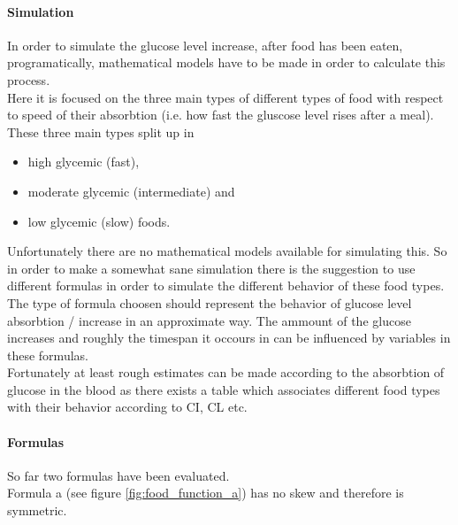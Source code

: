 \documentclass[pdflatex,a4paper,11pt,english]{scrreprt}
\begin{document}
\paragraph{Simulation} 
In order to simulate the glucose level increase, after food has been eaten, programatically, mathematical models have to be made in order to calculate this process. \\
Here it is focused on the three main types of different types of food with respect to speed of their absorbtion (i.e. how fast the gluscose level rises after a meal). \\
These three main types split up in

\begin{itemize}
  \item high glycemic (fast),
  \item moderate glycemic (intermediate) and
  \item low glycemic (slow) foods.
\end{itemize}

Unfortunately there are no mathematical models available for simulating this.
So in order to make a somewhat sane simulation there is the suggestion to use different formulas in order to simulate the different behavior of these food types. The type of formula choosen should represent the behavior of glucose level absorbtion / increase in an approximate way. The ammount of the glucose increases and roughly the timespan it occours in can be influenced by variables in these formulas. \\
Fortunately at least rough estimates can be made according to the absorbtion of
glucose in the blood as there exists a table which associates different food types
with their behavior according to CI, CL etc.

\newpage

\paragraph{Formulas} 
So far two formulas have been evaluated. \\
Formula a (see figure \vref{fig:food_function_a}) has no skew and therefore is
symmetric. 
\end{document}
